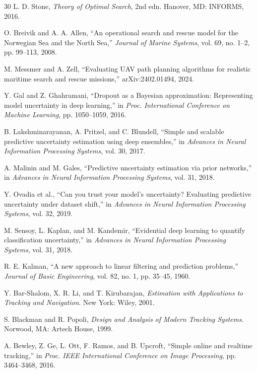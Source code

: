\documentclass[runningheads]{llncs}
\begin{document}
\begin{thebibliography}{30}
L. D. Stone, \textit{Theory of Optimal Search}, 2nd edn. Hanover, MD: INFORMS, 2016.

O. Breivik and A. A. Allen, ``An operational search and rescue model for the Norwegian Sea and the North Sea,'' \textit{Journal of Marine Systems}, vol. 69, no. 1--2, pp. 99--113, 2008.

M. Messmer and A. Zell, ``Evaluating UAV path planning algorithms for realistic maritime search and rescue missions,'' arXiv:2402.01494, 2024.

Y. Gal and Z. Ghahramani, ``Dropout as a Bayesian approximation: Representing model uncertainty in deep learning,'' in \textit{Proc. International Conference on Machine Learning}, pp. 1050--1059, 2016.

B. Lakshminarayanan, A. Pritzel, and C. Blundell, ``Simple and scalable predictive uncertainty estimation using deep ensembles,'' in \textit{Advances in Neural Information Processing Systems}, vol. 30, 2017.

A. Malinin and M. Gales, ``Predictive uncertainty estimation via prior networks,'' in \textit{Advances in Neural Information Processing Systems}, vol. 31, 2018.

Y. Ovadia et al., ``Can you trust your model's uncertainty? Evaluating predictive uncertainty under dataset shift,'' in \textit{Advances in Neural Information Processing Systems}, vol. 32, 2019.

M. Sensoy, L. Kaplan, and M. Kandemir, ``Evidential deep learning to quantify classification uncertainty,'' in \textit{Advances in Neural Information Processing Systems}, vol. 31, 2018.

R. E. Kalman, ``A new approach to linear filtering and prediction problems,'' \textit{Journal of Basic Engineering}, vol. 82, no. 1, pp. 35--45, 1960.

Y. Bar-Shalom, X. R. Li, and T. Kirubarajan, \textit{Estimation with Applications to Tracking and Navigation}. New York: Wiley, 2001.

S. Blackman and R. Popoli, \textit{Design and Analysis of Modern Tracking Systems}. Norwood, MA: Artech House, 1999.

A. Bewley, Z. Ge, L. Ott, F. Ramos, and B. Upcroft, ``Simple online and realtime tracking,'' in \textit{Proc. IEEE International Conference on Image Processing}, pp. 3464--3468, 2016.


\end{thebibliography}
\end{document}
